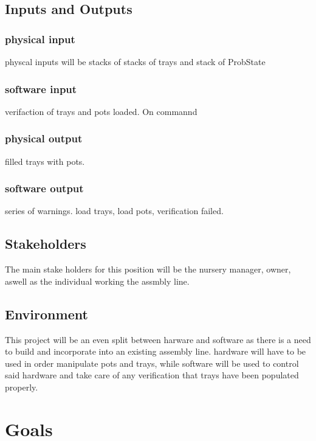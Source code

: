 \documentclass{article}
\begin{document}
\subsection{Inputs and Outputs}
\subsubsection{physical input}
physcal inputs will be stacks of stacks of trays and stack of ProbState
\subsubsection{software input}
verifaction of trays and pots loaded. On commannd
\subsubsection{physical output}
filled trays with pots.
\subsubsection{software output}
series of warnings. load trays, load pots, verification failed.


\subsection{Stakeholders}
The main stake holders for this position will be the nursery manager, owner, aswell as the individual working the assmbly line.

\subsection{Environment}
This project will be an even split between harware and software as there is a need to build and incorporate into an existing assembly line.
hardware will have to be used in order manipulate pots and trays, while software will be used to control said hardware 
and take care of any verification that trays have been populated properly.
\section{Goals}
\end{document}
